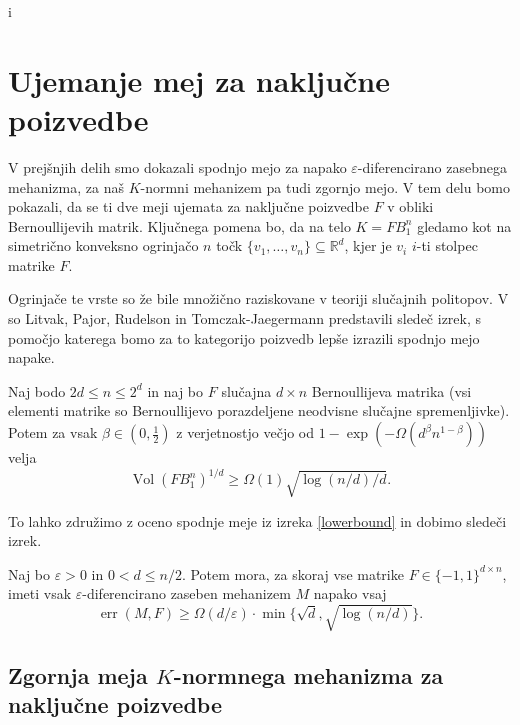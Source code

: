 i\documentclass[mat1]{fmfdelo}
\newcommand{\R}{\mathbb R}
\DeclareMathOperator{\Vol}{Vol}
\DeclareMathOperator*{\err}{err}
\begin{document}
\section{\texorpdfstring{Ujemanje mej za naključne poizvedbe}{Ujemanje mej za nakljucne poizvedbe}}

V prejšnjih delih smo dokazali spodnjo mejo za napako $\varepsilon$-diferencirano zasebnega mehanizma, za naš $K$-normni mehanizem pa tudi zgornjo mejo. V tem delu bomo pokazali, da se ti dve meji ujemata za naključne poizvedbe $F$ v obliki Bernoullijevih matrik. Ključnega pomena bo, da na telo $K=FB_1^n$ gledamo kot na simetrično konveksno ogrinjačo $n$ točk $\{v_1,\dots,v_n\} \subseteq \R^d$, kjer je $v_i$ $i$-ti stolpec matrike $F$.

Ogrinjače te vrste so že bile množično raziskovane v teoriji slučajnih politopov. V \cite{politop} so Litvak, Pajor, Rudelson in Tomczak-Jaegermann predstavili sledeč izrek, s pomočjo katerega bomo za to kategorijo poizvedb lepše izrazili spodnjo mejo napake.

\begin{izrek}
    Naj bodo $2d \leq n \leq 2^d$ in naj bo $F$ slučajna $d \times n$ Bernoullijeva matrika (vsi elementi matrike so Bernoullijevo porazdeljene neodvisne slučajne spremenljivke). Potem za vsak $\beta \in (0, \frac{1}{2})$ z verjetnostjo večjo od $1-\exp(-\Omega(d^\beta n^{1-\beta}))$ velja
    \begin{equation*}
        \Vol(FB_1^n)^{1/d} \geq \Omega(1) \sqrt{\log(n/d)/d}.
    \end{equation*}

\end{izrek}

To lahko združimo z oceno spodnje meje iz izreka \ref{lowerbound} in dobimo sledeči izrek.

\begin{izrek}
    Naj bo $\varepsilon > 0$ in $0 < d \leq n/2$. Potem mora, za skoraj vse matrike $F \in \{-1,1\}^{d \times n}$, imeti vsak $\varepsilon$-diferencirano zaseben mehanizem $M$ napako vsaj
    \begin{equation*}
        \err(M, F) \geq \Omega(d/\varepsilon) \cdot \min \{ \sqrt{d}, \sqrt{\log(n/d)} \}.
    \end{equation*}
\end{izrek}

\subsection{\texorpdfstring{Zgornja meja $K$-normnega mehanizma za naključne poizvedbe}{Zgornja meja K-normnega mehanizma za nakljucne poizvedbe}} \label{randomqer}
\end{document}

